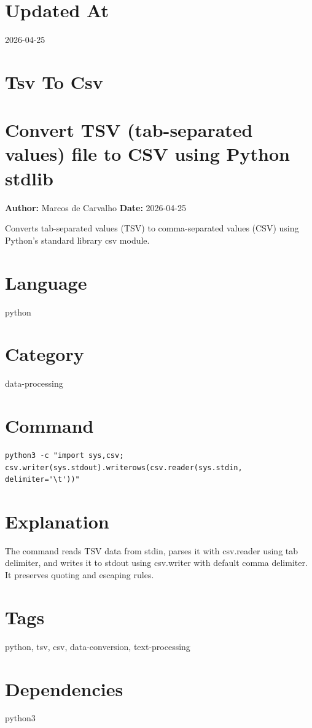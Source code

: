 \documentclass[openany]{book}
\begin{document}
\section*{Updated At}
2026-04-25

\section{Tsv To Csv}
\section*{Convert TSV (tab-separated values) file to CSV using Python stdlib}
\textbf{Author:} Marcos de Carvalho \hfill \textbf{Date:} 2026-04-25

\noindent Converts tab-separated values (TSV) to comma-separated values (CSV) using Python's standard library csv module.

\section*{Language}
python

\section*{Category}
data-processing

\section*{Command}
\begin{lstlisting}
python3 -c "import sys,csv; csv.writer(sys.stdout).writerows(csv.reader(sys.stdin, delimiter='\t'))"
\end{lstlisting}

\section*{Explanation}
The command reads TSV data from stdin, parses it with csv.reader using tab delimiter, and writes it to stdout using csv.writer with default comma delimiter. It preserves quoting and escaping rules.

\section*{Tags}
python, tsv, csv, data-conversion, text-processing

\section*{Dependencies}
python3
\end{document}
